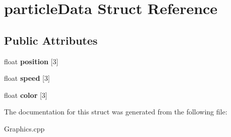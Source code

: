 \hypertarget{structparticle_data}{\section{particle\-Data Struct Reference}
\label{structparticle_data}
}
\subsection*{Public Attributes}
\begin{DoxyCompactItemize}
\item 
\hypertarget{structparticle_data_a00e1a7f02669ee6954cef7a1e37b26d6}{float {\bfseries position} \mbox{[}3\mbox{]}}\label{structparticle_data_a00e1a7f02669ee6954cef7a1e37b26d6}

\item 
\hypertarget{structparticle_data_a278b59d71a8c675d8148c482d12ba3f7}{float {\bfseries speed} \mbox{[}3\mbox{]}}\label{structparticle_data_a278b59d71a8c675d8148c482d12ba3f7}

\item 
\hypertarget{structparticle_data_a73d726d1b4e370c542a83b7f9edb3052}{float {\bfseries color} \mbox{[}3\mbox{]}}\label{structparticle_data_a73d726d1b4e370c542a83b7f9edb3052}

\end{DoxyCompactItemize}


The documentation for this struct was generated from the following file\-:\begin{DoxyCompactItemize}
\item 
Graphics.\-cpp\end{DoxyCompactItemize}
